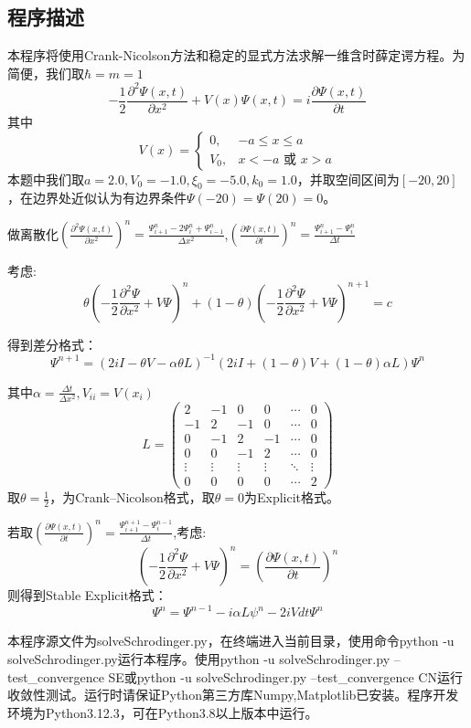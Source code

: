 \documentclass[11pt]{article}
\begin{document}
\subsection{程序描述}
本程序将使用Crank-Nicolson方法和稳定的显式方法求解一维含时薛定谔方程。为简便，我们取$\hbar=m=1$
\[-\frac{1}{2} \frac{\partial^2 \Psi(x, t)}{\partial x^2} + V(x) \Psi(x, t)=i\frac{\partial \Psi(x, t)}{\partial t}
\]
其中
\[
V(x) =
\begin{cases}
0, & -a \leq x \leq a \\
V_0, & x < -a \text{ 或 } x > a
\end{cases}
\]
本题中我们取$a=2.0,V_0=-1.0,\xi_0=-5.0,k_0=1.0$，并取空间区间为$[-20,20]$，在边界处近似认为有边界条件$\Psi(-20)=\Psi(20)=0$。

  做离散化$(\frac{\partial^2 \Psi(x, t)}{\partial x^2})^n={\frac{\Psi_{i+1}^n-2\Psi_{i}^n+\Psi_{i-1}^n}{\Delta x^2}}$,$(\frac{\partial \Psi(x, t)}{\partial t})^n=\frac{\Psi_{i+1}^n-\Psi_i^n}{\Delta t}$

  考虑:
\[\theta (-\frac{1}{2} \frac{\partial^2 \Psi}{\partial x^2} + V \Psi)^n+(1-\theta)(-\frac{1}{2} \frac{\partial^2 \Psi}{\partial x^2} + V \Psi)^{n+1}=c\]

得到差分格式：
\[\Psi^{n+1}=(2iI-\theta V-\alpha \theta L)^{-1}(2iI+(1-\theta) V+(1-\theta) \alpha L)\Psi^{n}\]

其中$\alpha=\frac{\Delta t}{\Delta x^2},V_{ii}=V(x_i)$
\[
L=\begin{pmatrix}
2 & -1 & 0 & 0 & \cdots & 0 \\
-1 & 2 & -1 & 0 & \cdots & 0 \\
0 & -1 & 2 & -1 & \cdots & 0 \\
0 & 0 & -1 & 2 & \cdots & 0 \\
\vdots & \vdots & \vdots & \vdots & \ddots & \vdots \\
0 & 0 & 0 & 0 & \cdots & 2
\end{pmatrix}
\]
取$\theta=\frac{1}{2}$，为Crank–Nicolson格式，取$\theta=0$为Explicit格式。

若取$(\frac{\partial \Psi(x, t)}{\partial t})^n=\frac{\Psi_{i+1}^{n+1}-\Psi_i^{n-1}}{\Delta t}$,考虑:
\[(-\frac{1}{2} \frac{\partial^2 \Psi}{\partial x^2} + V \Psi)^n=(\frac{\partial \Psi(x, t)}{\partial t})^n\]
则得到Stable Explicit格式：
\[\Psi^n=\Psi^{n-1}-i \alpha L \psi^n-2i V dt\Psi^n\]

本程序源文件为solveSchrodinger.py，在终端进入当前目录，使用命令python -u solveSchrodinger.py运行本程序。使用python -u solveSchrodinger.py --test\_convergence SE或python -u solveSchrodinger.py --test\_convergence CN运行收敛性测试。运行时请保证Python第三方库Numpy,Matplotlib已安装。程序开发环境为Python3.12.3，可在Python3.8以上版本中运行。
\end{document}
